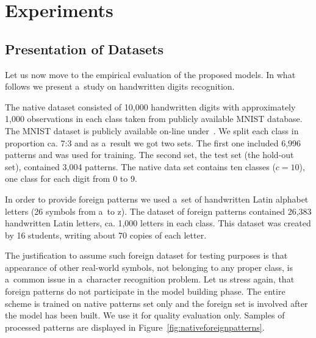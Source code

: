 \documentclass{llncs}
\begin{document}
\section{Experiments}
  \label{sec:Experiments}
  \vspace{-3pt}
  
\subsection{Presentation of Datasets}

Let us now move to the empirical evaluation of the proposed models. In what follows we present a~study on handwritten digits recognition.

The native dataset consisted of 10,000 handwritten digits with approximately 1,000 observations in each class taken from publicly available MNIST database. The MNIST dataset is publicly available on-line under~\cite{LeCunCortesBurges}. We split each class in proportion ca. 7:3 and as a~result we got two sets. The first one included 6,996 patterns and was used for training. The second set, the test set (the hold-out set), contained 3,004 patterns. The native data set contains ten classes ($c=10$), one class for each digit from 0 to 9. 

In order to provide foreign patterns we used a~set of handwritten Latin alphabet letters (26 symbols from a~to z). The dataset of foreign patterns contained 26,383 handwritten Latin letters, ca. 1,000 letters in each class. This dataset was created by 16 students, writing about 70 copies of each letter. 

The justification to assume such foreign dataset for testing purposes is that appearance of other real-world symbols, not belonging to any proper class, is a~common issue in a~character recognition problem. Let us stress again, that foreign patterns do not participate in the model building phase. The entire scheme is trained on native patterns set only and the foreign set is involved after the model has been built. We use it for quality evaluation only. Samples of processed patterns are displayed in Figure~\ref{fig:nativeforeignpatterns}. 
\end{document}
